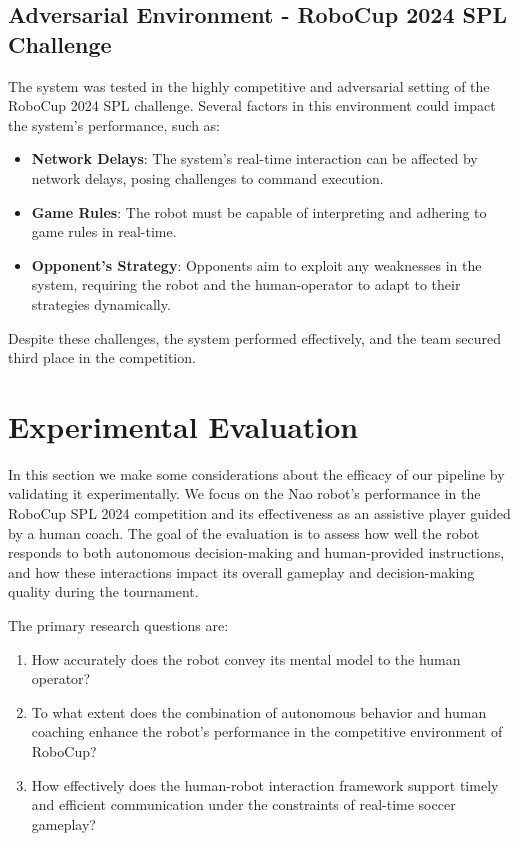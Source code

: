 \documentclass[a4paper, onecolumn, 12pt]{article}
\begin{document}
\subsection{Adversarial Environment - RoboCup 2024 SPL Challenge}  
The system was tested in the highly competitive and adversarial setting of the RoboCup 
2024 SPL challenge. Several factors in this environment could impact the system’s 
performance, such as:  
\begin{itemize}  
    \item \textbf{Network Delays}: The system’s real-time interaction can be affected 
    by network delays, posing challenges to command execution.  
    \item \textbf{Game Rules}: The robot must be capable of interpreting and adhering 
    to game rules in real-time.  
    \item \textbf{Opponent's Strategy}: Opponents aim to exploit any weaknesses in the 
    system, requiring the robot and the human-operator to adapt to their strategies dynamically.  
\end{itemize}  
Despite these challenges, the system performed effectively, and the team secured third 
place in the competition.  


\section{Experimental Evaluation} 

In this section we make some considerations about the efficacy of our pipeline by validating it experimentally. We focus on the Nao robot's performance in the RoboCup SPL 2024 competition and its effectiveness as an assistive player guided by a human coach. The goal of the evaluation is to assess how well the robot responds to both autonomous decision-making and human-provided instructions, and how these interactions impact its overall gameplay and decision-making quality during the tournament.

The primary research questions are:

\begin{enumerate}
    \item How accurately does the robot convey its mental model to the human operator?
    \item To what extent does the combination of autonomous behavior and human coaching enhance the robot’s performance in the competitive environment of RoboCup?
    \item How effectively does the human-robot interaction framework support timely and efficient communication under the constraints of real-time soccer gameplay?
\end{enumerate}
\end{document}
